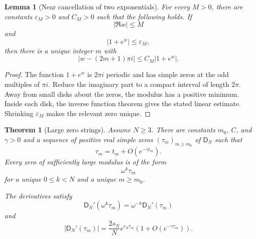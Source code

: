 \documentclass{aomart}
\newtheorem{theorem}{Theorem}[section]
\newtheorem{lemma}[lemma]{Lemma}
\theoremstyle{definition}
\theoremstyle{remark}
\newcommand{\Dfun}{\mathsf D}
\begin{document}
\begin{lemma}[Near cancellation of two exponentials]\label{lem:near_cancellation}
For every $M>0$, there are constants $\varepsilon_M>0$ and $C_M>0$ such that the following holds.  If
\[
|\Re w|\leq M
\]
and
\[
|1+e^w|\leq\varepsilon_M,
\]
then there is a unique integer $m$ with
\[
|w-(2m+1)\pi i|
\leq
C_M|1+e^w|.
\]
\end{lemma}

\begin{proof}
The function $1+e^w$ is $2\pi i$ periodic and has simple zeros at the odd multiples of $\pi i$.  Reduce the imaginary part to a compact interval of length $2\pi$.  Away from small disks about the zeros, the modulus has a positive minimum.  Inside each disk, the inverse function theorem gives the stated linear estimate.  Shrinking $\varepsilon_M$ makes the relevant zero unique.
\end{proof}

\begin{theorem}[Large zero strings]\label{thm:large_zero_strings}
Assume $N\geq3$.  There are constants $m_0$, $C$, and $\gamma>0$ and a sequence of positive real simple zeros $(\tau_m)_{m\geq m_0}$ of $\Dfun_N$ such that
\[
\tau_m
=
 t_m+O(e^{-\gamma t_m}).
\]
Every zero of sufficiently large modulus is of the form
\[
\omega^k\tau_m
\]
for a unique $0\leq k<N$ and a unique $m\geq m_0$.

The derivatives satisfy
\[
\Dfun_N'(\omega^k\tau_m)
=
\omega^{-k}\Dfun_N'(\tau_m)
\]
and
\[
|\Dfun_N'(\tau_m)|
=
\frac{2s_N}{N}e^{c_N\tau_m}
\left(1+O(e^{-\gamma\tau_m})\right).
\]
\end{theorem}
\end{document}
